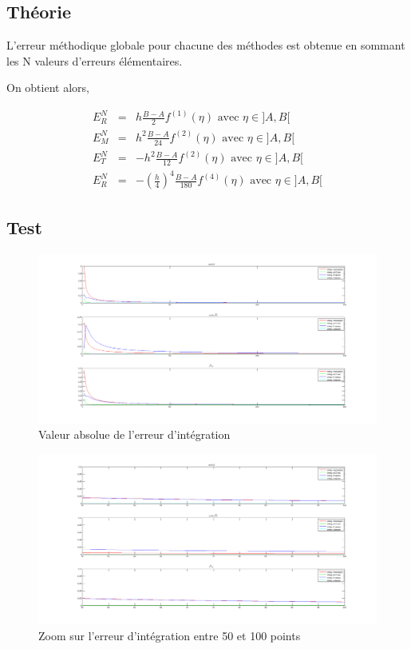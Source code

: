 \documentclass[a4paper,10pt]{report}
\begin{document}
\subsection*{Théorie}

L’erreur méthodique globale pour chacune des méthodes est obtenue en sommant les N valeurs d’erreurs élémentaires. 

On obtient alors,

\begin{eqnarray}
E^{N}_{R} &=& h \frac{B-A}{2}f^{(1)}(\eta) \text{ avec } \eta \in ]A, B[\\
E^{N}_{M} &=& h^2 \frac{B-A}{24}f^{(2)}(\eta) \text{ avec } \eta \in ]A, B[\\
E^{N}_{T} &=& -h^2 \frac{B-A}{12}f^{(2)}(\eta) \text{ avec } \eta \in ]A, B[\\
E^{N}_{R} &=& -\left(\frac{h}{4}\right)^4 \frac{B-A}{180}f^{(4)}(\eta) \text{ avec } \eta \in ]A, B[
\end{eqnarray}

\newpage
\subsection*{Test}


\begin{figure}[h]
	\begin{center}
		\includegraphics[scale=0.3]{error}
		\caption{Valeur absolue de l'erreur d'intégration}
	\end{center}
\end{figure}

\begin{figure}[h]
	\begin{center}
		\includegraphics[scale=0.3]{error2}
		\caption{Zoom sur l'erreur d'intégration entre 50 et 100 points}
	\end{center}
\end{figure}
\end{document}
